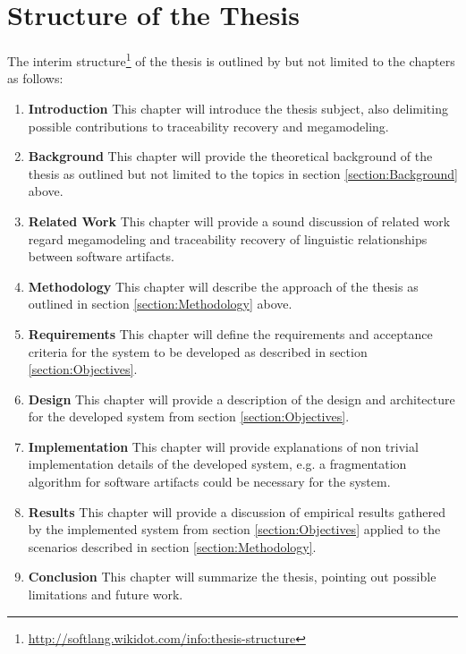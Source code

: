 \documentclass[runningheads,a4paper]{llncs}
\newcommand{\footnoteurl}[1]{\footnote{\url{#1}}}
\begin{document}
\section{Structure of the Thesis}
\label{section:StructureOfTheThesis}
The interim structure\footnoteurl{http://softlang.wikidot.com/info:thesis-structure} of the thesis is outlined by but not limited to the chapters as follows:

\begin{enumerate}

\item
\textbf{Introduction}
This chapter will introduce the thesis subject, also delimiting possible contributions to traceability recovery and megamodeling.

\item
\textbf{Background}
This chapter will provide the theoretical background of the thesis as outlined but not limited to the topics in section \ref{section:Background} above.

\item
\textbf{Related Work}
This chapter will provide a sound discussion of related work regard megamodeling and traceability recovery of linguistic relationships between software artifacts.

\item
\textbf{Methodology}
This chapter will describe the approach of the thesis as outlined in section \ref{section:Methodology} above.

\item
\textbf{Requirements}
This chapter will define the requirements and acceptance criteria for the system to be developed as described in section \ref{section:Objectives}.

\item
\textbf{Design}
This chapter will provide a description of the design and architecture for the developed system from section \ref{section:Objectives}.

\item
\textbf{Implementation}
This chapter will provide explanations of non trivial implementation details of the developed system, e.g. a fragmentation algorithm for software artifacts could be necessary for the system.

\item
\textbf{Results}
This chapter will provide a discussion of empirical results gathered by the implemented system from section \ref{section:Objectives} applied to the scenarios described in section \ref{section:Methodology}.

\item
\textbf{Conclusion}
This chapter will summarize the thesis, pointing out possible limitations and future work.

\end{enumerate}
\end{document}
